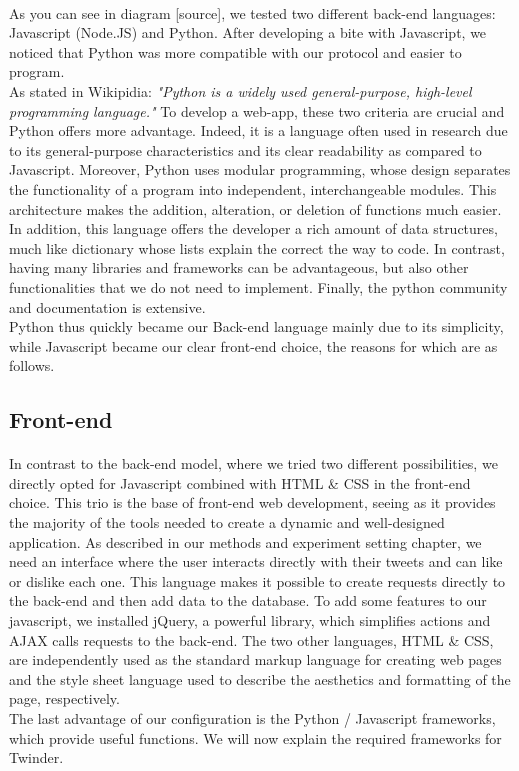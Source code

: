 \paragraph{}
As you can see in diagram [source], we tested two different back-end languages: Javascript (Node.JS) and Python. After developing a bite with Javascript, we noticed that Python was more compatible with our protocol and easier to program. \\
As stated in Wikipidia: \textit{"Python is a widely used general-purpose, high-level programming language."} To develop a web-app, these two criteria are crucial and Python offers more advantage. Indeed, it is a language often used in research due to its general-purpose characteristics and its clear readability as compared to Javascript. Moreover, Python uses modular programming, whose design separates the functionality of a program into independent, interchangeable modules. This architecture makes the addition, alteration, or deletion of functions much easier. In addition, this language offers the developer a rich amount of data structures, much like dictionary whose lists explain the correct the way to code. In contrast, having many libraries and frameworks can be advantageous, but also other functionalities that we do not need to implement. Finally, the python community and documentation is extensive. \\
Python thus quickly became our Back-end language mainly due to its simplicity, while Javascript became our clear front-end choice, the reasons for which are as follows.

\subsection{Front-end}

\paragraph{}
In contrast to the back-end model, where we tried two different possibilities, we directly opted for Javascript combined with HTML \& CSS in the front-end choice. This trio is the base of front-end web development, seeing as it provides the majority of the tools needed to create a dynamic and well-designed application. As described in our methods and experiment setting chapter, we need an interface where the user interacts directly with their tweets and can like or dislike each one. This language makes it possible to create requests directly to the back-end and then add data to the database. To add some features to our javascript, we installed jQuery, a powerful library, which simplifies actions and AJAX calls requests to the back-end. The two other languages, HTML \& CSS, are independently used as the standard markup language for creating web pages and the style sheet language used to describe the  aesthetics and formatting of the page, respectively. \\
The last advantage of our configuration is the Python / Javascript frameworks, which provide useful functions. We will now explain the required frameworks for Twinder.



